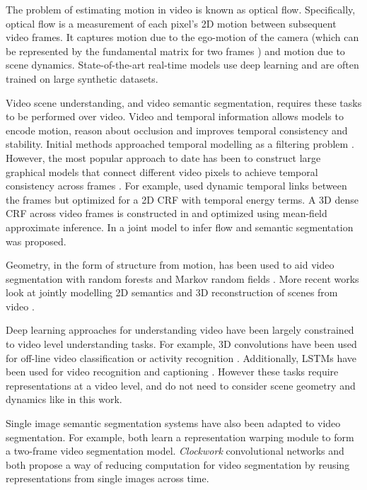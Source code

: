 The problem of estimating motion in video is known as optical flow. Specifically, optical flow is a measurement of each pixel's 2D motion between subsequent video frames. It captures motion due to the ego-motion of the camera (which can be represented by the fundamental matrix for two frames \cite{hartley2003multiple}) and motion due to scene dynamics. State-of-the-art real-time models use deep learning \cite{flownet,flownet2} and are often trained on large synthetic datasets.

Video scene understanding, and video semantic segmentation, requires these tasks to be performed over video. Video and temporal information allows models to encode motion, reason about occlusion and improves temporal consistency and stability. Initial methods approached temporal modelling as a filtering problem \cite{miksik2013efficient}.
However, the most popular approach to date has been to construct large graphical models that connect different video pixels to achieve temporal consistency across frames \cite{de2012line,chen2011temporally,tripathi2015semantic,hur2016joint}. For example,\cite{chen2011temporally} used dynamic temporal links between the frames but optimized for a 2D CRF with temporal energy terms.
A 3D dense CRF across video frames is constructed in \cite{tripathi2015semantic} and optimized using mean-field approximate inference. In \cite{hur2016joint} a joint model to infer flow and semantic segmentation was proposed.

Geometry, in the form of structure from motion, has been used to aid video segmentation with random forests \cite{brostow2008segmentation} and Markov random fields \cite{tighe2013superparsing}.
More recent works look at jointly modelling 2D semantics and 3D reconstruction of scenes from video \cite{kundu2014joint,sengupta2013urban}.

Deep learning approaches for understanding video have been largely constrained to video level understanding tasks. For example, 3D convolutions have been used for off-line video classification \cite{karpathy2014large} or activity recognition \cite{ji20133d}. Additionally, LSTMs have been used for video recognition and captioning \cite{donahue2015long}. However these tasks require representations at a video level, and do not need to consider scene geometry and dynamics like in this work.

Single image semantic segmentation systems have also been adapted to video segmentation. For example, \cite{zhu2017deep,gadde2017semantic} both learn a representation warping module to form a two-frame video segmentation model. \textit{Clockwork} convolutional networks \cite{shelhamer2016clockwork} and \cite{zhu2017deep} both propose a way of reducing computation for video segmentation by reusing representations from single images across time.


